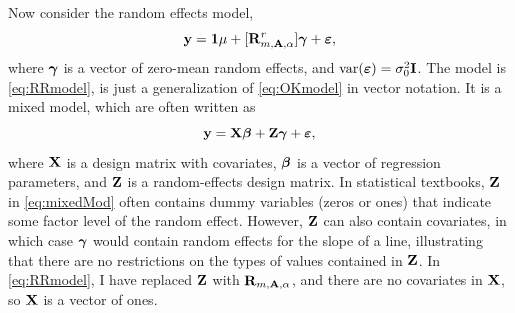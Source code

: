 \documentclass[11pt, titlepage]{article}\usepackage[]{graphicx}\usepackage[]{color}
\begin{document}
\begin{spacing}{1.9}
\begin{flushleft}
Now consider the random effects model,
\begin{equation} \label{eq:RRmodel}
	\mathbf{y} = \mathbf{1}\mu + [\mathbf{R}^r_{m,\mathbf{A},\alpha}]\mbox{\boldmath $\gamma$} + \mbox{\boldmath $\varepsilon$},
\end{equation}
where $\mbox{\boldmath $\gamma$}$ is a vector of zero-mean random effects, and $\textrm{var}(\mbox{\boldmath $\varepsilon$}) = \sigma^2_0 \mathbf{I}$.  The model is \ref{eq:RRmodel}, is just a generalization of \ref{eq:OKmodel} in vector notation. It is a mixed model, which are often written as
\begin{equation} \label{eq:mixedMod}
    \mathbf{y} = \mathbf{X}{\boldsymbol{\beta}} + \mathbf{Z}\mbox{\boldmath $\gamma$} + \mbox{\boldmath $\varepsilon$},
\end{equation}
 where $\mathbf{X}$ is a design matrix with covariates, ${\boldsymbol{\beta}}$ is a vector of regression parameters, and $\mathbf{Z}$ is a random-effects design matrix.  In statistical textbooks, $\mathbf{Z}$ in \ref{eq:mixedMod} often contains dummy variables (zeros or ones) that indicate some factor level of the random effect.  However, $\mathbf{Z}$ can also contain covariates, in which case $\mbox{\boldmath $\gamma$}$ would contain random effects for the slope of a line, illustrating that there are no restrictions on the types of values contained in $\mathbf{Z}$. In \ref{eq:RRmodel}, I have replaced $\mathbf{Z}$ with $\mathbf{R}_{m,\mathbf{A},\alpha}$, and there are no covariates in $\mathbf{X}$, so $\mathbf{X}$ is a vector of ones.


\end{flushleft}
\end{spacing}
\end{document}
